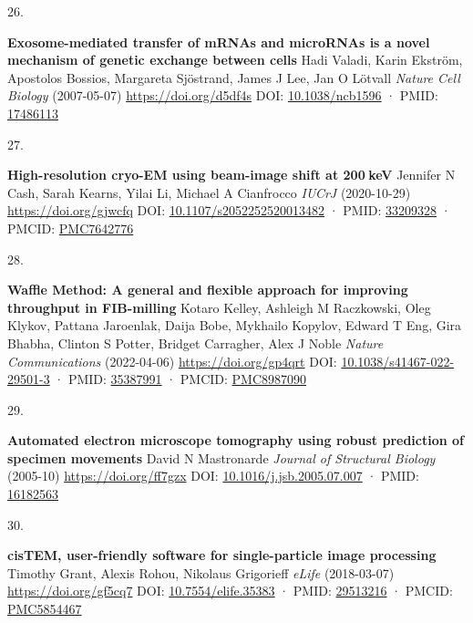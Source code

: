 \documentclass[
]{article}
\newlength{\cslhangindent}
\newlength{\csllabelwidth}
\newlength{\cslentryspacingunit} %
\newenvironment{CSLReferences}[2] %
 {%
  \setlength{\parindent}{0pt}
  \ifodd #1
  \let\oldpar\par
  \def\par{\hangindent=\cslhangindent\oldpar}
  \fi
  \setlength{\parskip}{#2\cslentryspacingunit}
 }%
 {}
\newcommand{\CSLBlock}[1]{#1\hfill\break}
\newcommand{\CSLLeftMargin}[1]{\parbox[t]{\csllabelwidth}{#1}}
\newcommand{\CSLRightInline}[1]{\parbox[t]{\linewidth - \csllabelwidth}{#1}\break}
\begin{document}
\begin{CSLReferences}{0}{0}
\leavevmode{}%
\CSLLeftMargin{26. }%
\CSLRightInline{\textbf{Exosome-mediated transfer of mRNAs and microRNAs is a novel mechanism of genetic exchange between cells}
\CSLBlock{Hadi Valadi, Karin Ekström, Apostolos Bossios, Margareta Sjöstrand, James J Lee, Jan O Lötvall} \emph{Nature Cell Biology} (2007-05-07) \url{https://doi.org/d5df4s}
\CSLBlock{DOI: \href{https://doi.org/10.1038/ncb1596}{10.1038/ncb1596} · PMID: \href{https://www.ncbi.nlm.nih.gov/pubmed/17486113}{17486113}}}

\leavevmode{}%
\CSLLeftMargin{27. }%
\CSLRightInline{\textbf{High-resolution cryo-EM using beam-image shift at 200 keV}
\CSLBlock{Jennifer N Cash, Sarah Kearns, Yilai Li, Michael A Cianfrocco} \emph{IUCrJ} (2020-10-29) \url{https://doi.org/gjwcfq}
\CSLBlock{DOI: \href{https://doi.org/10.1107/s2052252520013482}{10.1107/s2052252520013482} · PMID: \href{https://www.ncbi.nlm.nih.gov/pubmed/33209328}{33209328} · PMCID: \href{https://www.ncbi.nlm.nih.gov/pmc/articles/PMC7642776}{PMC7642776}}}

\leavevmode{}%
\CSLLeftMargin{28. }%
\CSLRightInline{\textbf{Waffle Method: A general and flexible approach for improving throughput in FIB-milling}
\CSLBlock{Kotaro Kelley, Ashleigh M Raczkowski, Oleg Klykov, Pattana Jaroenlak, Daija Bobe, Mykhailo Kopylov, Edward T Eng, Gira Bhabha, Clinton S Potter, Bridget Carragher, Alex J Noble} \emph{Nature Communications} (2022-04-06) \url{https://doi.org/gp4qrt}
\CSLBlock{DOI: \href{https://doi.org/10.1038/s41467-022-29501-3}{10.1038/s41467-022-29501-3} · PMID: \href{https://www.ncbi.nlm.nih.gov/pubmed/35387991}{35387991} · PMCID: \href{https://www.ncbi.nlm.nih.gov/pmc/articles/PMC8987090}{PMC8987090}}}

\leavevmode{}%
\CSLLeftMargin{29. }%
\CSLRightInline{\textbf{Automated electron microscope tomography using robust prediction of specimen movements}
\CSLBlock{David N Mastronarde} \emph{Journal of Structural Biology} (2005-10) \url{https://doi.org/ff7gzx}
\CSLBlock{DOI: \href{https://doi.org/10.1016/j.jsb.2005.07.007}{10.1016/j.jsb.2005.07.007} · PMID: \href{https://www.ncbi.nlm.nih.gov/pubmed/16182563}{16182563}}}

\leavevmode{}%
\CSLLeftMargin{30. }%
\CSLRightInline{\textbf{cisTEM, user-friendly software for single-particle image processing}
\CSLBlock{Timothy Grant, Alexis Rohou, Nikolaus Grigorieff} \emph{eLife} (2018-03-07) \url{https://doi.org/gf5cq7}
\CSLBlock{DOI: \href{https://doi.org/10.7554/elife.35383}{10.7554/elife.35383} · PMID: \href{https://www.ncbi.nlm.nih.gov/pubmed/29513216}{29513216} · PMCID: \href{https://www.ncbi.nlm.nih.gov/pmc/articles/PMC5854467}{PMC5854467}}}


\end{CSLReferences}
\end{document}
